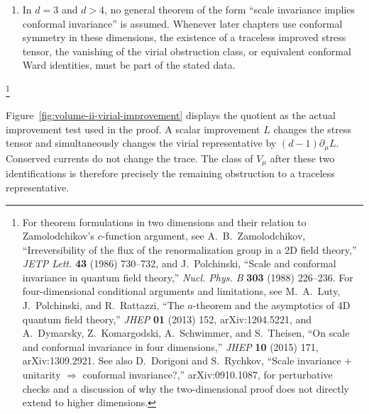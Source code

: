 \begin{remark}
\begin{enumerate}[label=(\alph*)]
  the quotient determined by the allowed improvements.  The necessary
  spectral, regularity, and contact-term assumptions must be stated
  separately.  Some claims in the physics literature are better understood as
  conditional arguments or conjectural criteria rather than fully formulated
  mathematical theorems.
\item In \(d=3\) and \(d>4\), no general theorem of the form ``scale
  invariance implies conformal invariance'' is assumed.  Whenever later
  chapters use conformal symmetry in these dimensions, the existence of a
  traceless improved stress tensor, the vanishing of the virial obstruction
  class, or equivalent conformal Ward identities, must be part of the stated
  data.
\end{enumerate}
\footnote{For theorem formulations in two dimensions and their relation to
Zamolodchikov's \(c\)-function argument, see A.~B.~Zamolodchikov,
``Irreversibility of the flux of the
renormalization group in a 2D field theory,'' \emph{JETP Lett.} \textbf{43}
(1986) 730--732, and J.~Polchinski, ``Scale and conformal invariance in
quantum field theory,'' \emph{Nucl. Phys. B} \textbf{303} (1988) 226--236.
For four-dimensional conditional arguments and limitations, see
M.~A.~Luty, J.~Polchinski, and R.~Rattazzi, ``The \(a\)-theorem and the
asymptotics of 4D quantum field theory,'' \emph{JHEP} \textbf{01} (2013) 152,
arXiv:1204.5221, and A.~Dymarsky, Z.~Komargodski, A.~Schwimmer, and
S.~Theisen, ``On scale and conformal invariance in four dimensions,''
\emph{JHEP} \textbf{10} (2015) 171, arXiv:1309.2921.  See also
D.~Dorigoni and S.~Rychkov, ``Scale invariance \(+\) unitarity
\(\Rightarrow\) conformal invariance?,'' arXiv:0910.1087, for perturbative
checks and a discussion of why the two-dimensional proof does not directly
extend to higher dimensions.}
\end{remark}

Figure~\ref{fig:volume-ii-virial-improvement} displays the quotient as the
actual improvement test used in the proof.  A scalar improvement \(L\) changes
the stress tensor and simultaneously changes the virial representative by
\((d-1)\partial_\mu L\).  Conserved currents do not change the trace.  The
class of \(V_\mu\) after these two identifications is therefore precisely the
remaining obstruction to a traceless representative.

